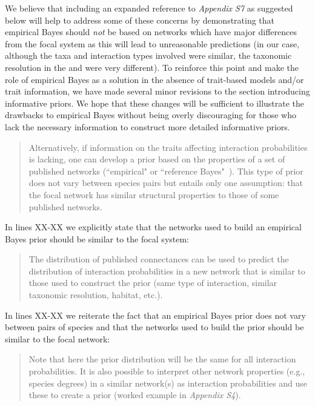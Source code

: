 \documentclass[12pt]{letter}
\begin{document}
		We believe that including an expanded reference to \emph{Appendix S7} as suggested below will help to address some of these concerns by demonstrating that empirical Bayes should \emph{not} be based on networks which have major differences from the focal system as this will lead to unreasonable predictions (in our case, although the taxa and interaction types involved were similar, the taxonomic resolution in the \citet{Barbour2016} and \citet{Kopelke2017} were very different). To reinforce this point and make the role of empirical Bayes as a solution in the absence of trait-based models and/or trait information, we have made several minor revisions to the section introducing informative priors. We hope that these changes will be sufficient to illustrate the drawbacks to empirical Bayes without being overly discouraging for those who lack the necessary information to construct more detailed informative priors.


		\begin{quotation}

			Alternatively, if information on the traits affecting interaction probabilities is lacking, one can develop a prior based on the properties of a set of published networks (``empirical" or ``reference Bayes"~\citet{Spiegelhalter2000}). This type of prior does not vary between species pairs but entails only one assumption: that the focal network has similar structural properties to those of some published networks. 

		\end{quotation} 


		In lines XX-XX we explicitly state that the networks used to build an empirical Bayes prior should be similar to the focal system:


		\begin{quotation}

			The distribution of published connectances can be used to predict the distribution of interaction probabilities in a new network that is similar to those used to construct the prior (same type of interaction, similar taxonomic resolution, habitat, etc.).

		\end{quotation}


		In lines XX-XX we reiterate the fact that an empirical Bayes prior does not vary between pairs of species and that the networks used to build the prior should be similar to the focal network:


		\begin{quotation}

		Note that here the prior distribution will be the same for all interaction probabilities. It is also possible to interpret other network properties (e.g., species degrees) in a similar network(s) as interaction probabilities and use these to create a prior (worked example in \emph{Appendix S4}).

		\end{quotation}
\end{document}

